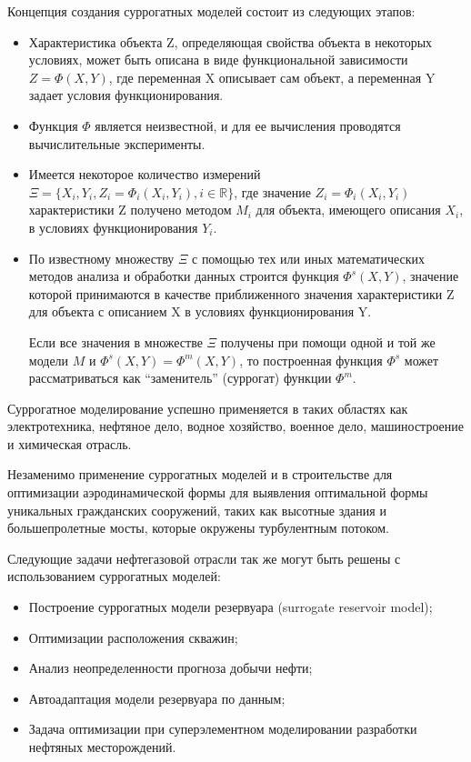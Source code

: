 Концепция создания суррогатных моделей состоит из следующих этапов: 
\begin{itemize}
\tightlist
\item  
  Характеристика объекта Z, определяющая свойства объекта в некоторых условиях, может быть описана в виде функциональной зависимости $Z= \Phi(X,Y)$,  где переменная X описывает сам объект, а переменная Y задает условия функционирования.
\item
  Функция $\Phi$ является неизвестной, и для ее вычисления проводятся вычислительные эксперименты.
\item
  Имеется некоторое количество измерений $ \Xi = \{ X_i,Y_i,Z_i= \Phi_i ( X_i,Y_i ), i \in \mathbb{R} \} $,
где значение  $Z_i= \Phi_i (X_i,Y_i ) $ характеристики Z получено методом $M_i$ для объекта, имеющего описания $X_i$, в условиях функционирования $Y_i$.
\item
  По известному множеству $\Xi$ с помощью тех или иных математических методов анализа и обработки данных строится функция $\Phi^s (X,Y)$, значение которой принимаются в качестве приближенного значения характеристики Z для объекта с описанием X в условиях функционирования Y.

Если все значения в множестве $\Xi$ получены при помощи одной и той же модели $M$ и $\Phi^s (X,Y) = \Phi^m (X,Y)$, то построенная функция $\Phi^s$ может рассматриваться как ``заменитель'' (суррогат) функции $\Phi^m$.  
\end{itemize}

Суррогатное моделирование успешно применяется в таких областях как электротехника, нефтяное дело, водное хозяйство, военное дело, машиностроение и химическая отрасль.

Незаменимо применение суррогатных моделей и в строительстве для оптимизации аэродинамической формы для выявления оптимальной формы уникальных гражданских сооружений, таких как высотные здания и большепролетные мосты, которые окружены турбулентным потоком.

Следующие задачи нефтегазовой отрасли так же могут быть решены с использованием суррогатных моделей:

\begin{itemize}
\tightlist
\item Построение суррогатных модели резервуара (surrogate reservoir model);
\item Оптимизации расположения скважин;
\item Анализ неопределенности прогноза добычи нефти;
\item Автоадаптация модели резервуара по данным;
\item Задача оптимизации при суперэлементном моделировании разработки нефтяных месторождений.
\end{itemize}


